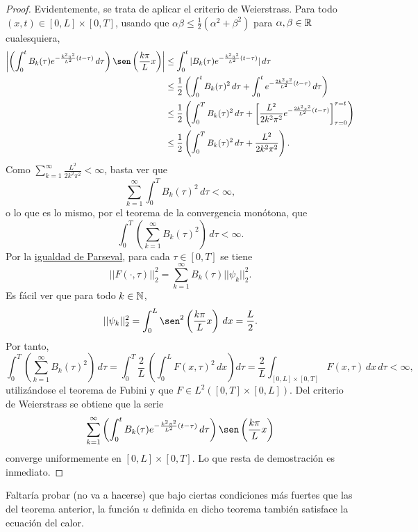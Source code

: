 \documentclass[a4paper, 12pt, extrafontsizes]{memoir}
\begin{document}
\begin{proof}
    Evidentemente, se trata de aplicar el criterio de Weierstrass. Para todo $(x,t) \in [0,L] \times [0,T]$, usando que $\alpha\beta\leq\frac{1}{2}(\alpha^2+\beta^2)$ para $\alpha,\beta \in \mathbb R$ cualesquiera,
    \begin{align*}
        \left| \left(\int_0^t B_k(\tau)e^{-\frac{k^2\pi^2}{L^2}(t-\tau)}\, d\tau\right)\sen\left(\frac{k\pi}{L}x\right)\right| &\leq \int_0^t |B_k(\tau)e^{-\frac{k^2\pi^2}{L^2}(t-\tau)}|\, d\tau \\
        &\leq \frac{1}{2}\left(\int_0^t B_k(\tau)^2\, d\tau + \int_0^t e^{-\frac{2k^2\pi^2}{L^2}(t-\tau)}\, d\tau\right) \\
        &\leq \frac{1}{2}\left(\int_0^T B_k(\tau)^2\, d\tau + \left[\frac{L^2}{2k^2\pi^2}e^{-\frac{2k^2\pi^2}{L^2}(t-\tau)}\right]_{\tau=0}^{\tau=t}\right) \\
        &\leq \frac{1}{2}\left(\int_0^T B_k(\tau)^2\, d\tau + \frac{L^2}{2k^2\pi^2}\right). \\
    \end{align*}
    Como $\sum_{k=1}^\infty \frac{L^2}{2k^2\pi^2} < \infty$, basta ver que
    \[\sum_{k=1}^\infty \int_0^TB_k(\tau)^2\, d\tau<\infty,\]
    o lo que es lo mismo, por el teorema de la convergencia monótona, que 
    \[\int_0^T\left(\sum_{k=1}^\infty B_k(\tau)^2\right) \, d\tau<\infty.\]
    Por la \hyperref[cor:A.2.10]{\color{gray}igualdad de Parseval}, para cada $\tau \in [0,T]$ se tiene
    \[||F(\cdot,\tau)||_2^2= \sum_{k=1}^\infty B_k(\tau)||\psi_k||_2^2.\]
    Es fácil ver que para todo $k \in \mathbb N$,
    \[||\psi_k||_2^2 = \int_0^L \sen^2\left(\frac{k\pi}{L}x\right) \, dx = \frac{L}{2}.\]
    Por tanto,
    \[\int_0^T\left(\sum_{k=1}^\infty B_k(\tau)^2\right) \, d\tau = \int_0^T\frac{2}{L}\, \left(\int_0^L F(x,\tau)^2\, dx\right)d\tau = \frac{2}{L}\int_{[0,L] \times [0,T]}F(x,\tau)\,dx\, d\tau < \infty,\]
    utilizándose el teorema de Fubini y que $F \in L^2([0,T] \times [0,L])$. Del criterio de Weierstrass se obtiene que la serie
    \[\sum_{k=1}^\infty \left(\int_0^t B_k(\tau)e^{-\frac{k^2\pi^2}{L^2}(t-\tau)}\, d\tau\right)\sen\left(\frac{k\pi}{L}x\right)\]
    converge uniformemente en $[0,L] \times [0,T]$. Lo que resta de demostración es inmediato.
\end{proof}

Faltaría probar (no va a hacerse) que bajo ciertas condiciones más fuertes que las del teorema anterior, la función $u$ definida en dicho teorema también satisface la ecuación del calor.
\end{document}
